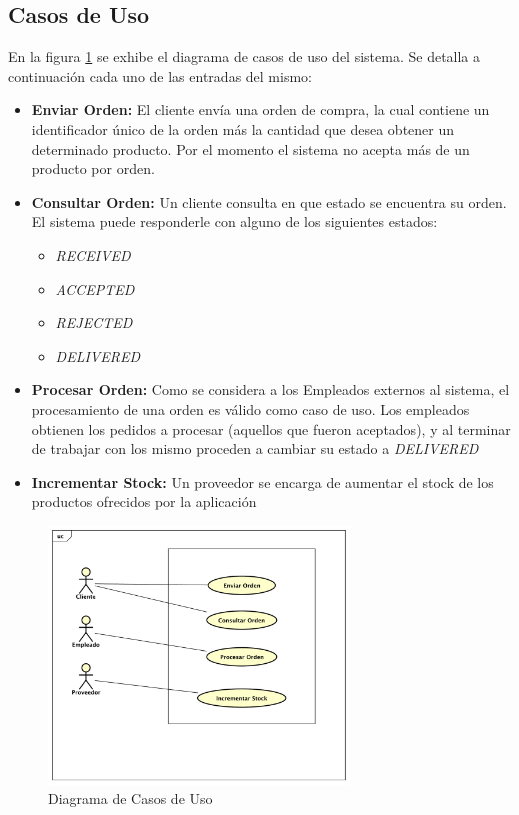 \documentclass[a4paper,10pt]{article}
\begin{document}
    \subsection{Casos de Uso}
        En la figura \ref{DiagCU} se exhibe el diagrama de casos de uso del 
        sistema. Se detalla a continuación cada uno de las entradas del mismo:
        \begin{itemize}
            \item \textbf{Enviar Orden:} El cliente envía una orden de compra,
            la cual contiene un identificador único de la orden más la cantidad
            que desea obtener un determinado producto. Por el momento el 
            sistema no acepta más de un producto por orden.
            \item \textbf{Consultar Orden:} Un cliente consulta en que 
            estado se encuentra su orden. El sistema puede responderle con 
            alguno de los siguientes estados: 
            \begin{itemize}
                \item \textit{RECEIVED}
                \item \textit{ACCEPTED}
                \item \textit{REJECTED}
                \item \textit{DELIVERED}
            \end{itemize}
            \item \textbf{Procesar Orden:} Como se considera a los Empleados
            externos al sistema, el procesamiento de una orden es válido como
            caso de uso. Los empleados obtienen los pedidos a procesar 
            (aquellos que fueron aceptados), y al terminar de trabajar con los
            mismo proceden a cambiar su estado a \textit{DELIVERED}
            \item \textbf{Incrementar Stock:} Un proveedor se encarga de 
            aumentar el stock de los productos ofrecidos por la aplicación
        \end{itemize}

        \begin{figure}[!htb]                                             
            \centering                                                   
            \includegraphics[width=8cm,origin=c]{Imagenes/Casos_De_Uso.pdf}        
            \caption{Diagrama de Casos de Uso} \label{DiagCU}
        \end{figure}
\end{document}
